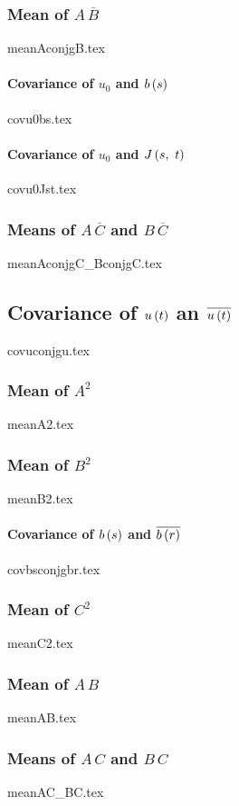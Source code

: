 \documentclass[letterpaper, 12pt]{article}
\begin{document}
			\subsubsection{Mean of $A\,\overline{B}$} \label{app:mean_AconjgB}
				{meanAconjgB.tex}
				\paragraph{Covariance of $u_0$ and $b \left( s \right)$}
					{covu0bs.tex}
				\paragraph{Covariance of $u_0$ and $J \left( s,\ t \right)$}
					{covu0Jst.tex}
			\subsubsection{Means of $A\,\overline{C}$ and $B\,\overline{C}$} \label{app:mean_AconjgC_BconjgC}
				{meanAconjgC_BconjgC.tex}
		\subsection{Covariance of $u \left( t \right)$ an $\overline{u \left( t \right)}$}
			{covuconjgu.tex}
			\subsubsection{Mean of $A^2$}
				{meanA2.tex}
			\subsubsection{Mean of $B^2$}
				{meanB2.tex}
				\paragraph{Covariance of $b \left( s \right)$ and $\overline{b \left( r \right)}$}
					{covbsconjgbr.tex}
			\subsubsection{Mean of $C^2$}
				{meanC2.tex}
			\subsubsection{Mean of $A\,B$}
				{meanAB.tex}
			\subsubsection{Means of $A\,C$ and $B\,C$} \label{app:mean_AC_BC}
				{meanAC_BC.tex}
\end{document}
